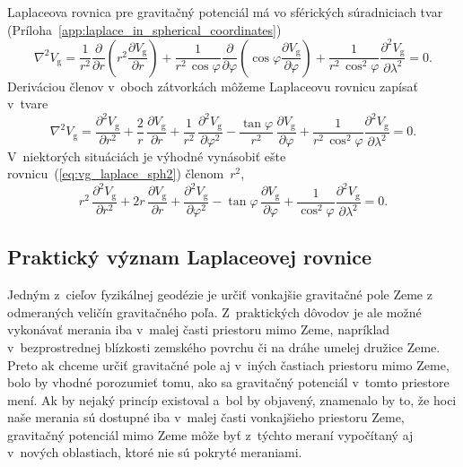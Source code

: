\documentclass[a4paper, 12pt]{book}
\newcommand{\gidx}{\mathrm g}
\begin{document}
Laplaceova rovnica pre gravitačný potenciál má vo sférických súradniciach tvar 
(Príloha~\ref{app:laplace_in_spherical_coordinates})
%
\begin{equation}
\label{eq:vg_laplace_sph}
\nabla^2 V_\gidx = \frac{1}{r^2} \frac{\partial}{\partial r} \left( r^2 
\frac{\partial V_\gidx}{\partial r} \right) + \frac{1}{r^2 \, \cos\varphi} 
\frac{\partial}{\partial \varphi} \left( \cos\varphi \frac{\partial 
V_\gidx}{\partial \varphi} \right) + \frac{1}{r^2 \, 
\cos^2\varphi}\frac{\partial^2 V_\gidx}{\partial \lambda^2} = 0{.}
\end{equation}
%
Deriváciou členov v~oboch zátvorkách môžeme Laplaceovu rovnicu zapísať v~tvare
%
\begin{equation}
\label{eq:vg_laplace_sph2}
\nabla^2 V_\gidx = \frac{\partial^2 V_\gidx}{\partial r^2} + \frac{2}{r} \, 
\frac{\partial V_\gidx}{\partial r} + \frac{1}{r^2} \, \frac{\partial^2 
V_\gidx}{\partial \varphi^2} - \frac{\tan\varphi}{r^2} \, \frac{\partial 
V_\gidx}{\partial \varphi} + \frac{1}{r^2 \,
\cos^2\varphi}\frac{\partial^2 V_\gidx}{\partial \lambda^2} = 0{.}
\end{equation}
%
V~niektorých situáciách je výhodné vynásobiť ešte 
rovnicu~(\ref{eq:vg_laplace_sph2}) členom~$r^2$,
%
\begin{equation}
\label{eq:vg_laplace_sph3}
r^2 \, \frac{\partial^2 V_\gidx}{\partial r^2} + 2r \, \frac{\partial 
V_\gidx}{\partial r} + \frac{\partial^2 V_\gidx}{\partial \varphi^2} 
- \tan\varphi \, \frac{\partial V_\gidx}{\partial \varphi} 
+ \frac{1}{\cos^2\varphi}\frac{\partial^2 V_\gidx}{\partial \lambda^2} = 0{.}
\end{equation}



\subsection{Praktický význam Laplaceovej rovnice}
\label{sec:meaning_of_laplace_equation_in_practice}

Jedným z~cieľov fyzikálnej geodézie je určiť vonkajšie gravitačné pole Zeme 
z odmeraných veličín gravitačného poľa.  Z~praktických dôvodov je ale možné 
vykonávať merania iba v~malej časti priestoru mimo Zeme, napríklad 
v~bezprostrednej blízkosti zemského povrchu či na dráhe umelej družice Zeme.  
Preto ak chceme určiť gravitačné pole aj v~iných častiach priestoru mimo Zeme, 
bolo by vhodné porozumieť tomu, ako sa gravitačný potenciál v~tomto priestore 
mení.  Ak by nejaký princíp existoval a~bol by objavený, znamenalo by to, že 
hoci naše merania sú dostupné iba v~malej časti vonkajšieho priestoru Zeme, 
gravitačný potenciál mimo Zeme môže byť z~týchto meraní vypočítaný aj v~nových 
oblastiach, ktoré nie sú pokryté meraniami.
\end{document}
